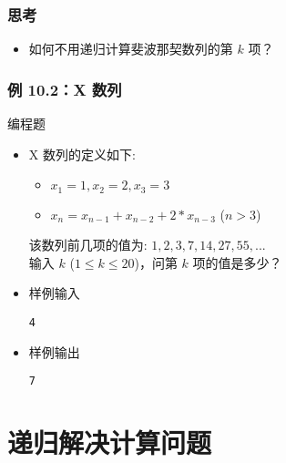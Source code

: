 \begin{frame}[fragile]
    \frametitle{思考}
    \begin{itemize}
        \item 如何不用递归计算斐波那契数列的第 $k$ 项？
    \end{itemize}

     {}

\end{frame}

\begin{frame}[fragile]
    \frametitle{例 10.2：X 数列}
     {
        \begin{exampleblock}{编程题}
            \begin{itemize}
                \item X 数列的定义如下: \\
                    \begin{itemize}
                        \item $x_1=1,x_2=2,x_3=3$
                        \item $x_n=x_{n-1}+x_{n-2}+2*x_{n-3}$ ($n>3$)
                    \end{itemize}
                    该数列前几项的值为: $1,2,3,7,14,27,55,...$\\
                    输入 $k$ ($1 \leq k \leq 20$)，问第 $k$ 项的值是多少？
                
                \item 样例输入
    
                    \lstinline|4|     

                \item 样例输出
                
                    \lstinline|7|
    
            \end{itemize}
        \end{exampleblock}
    }

\end{frame}


\section{递归解决计算问题}

